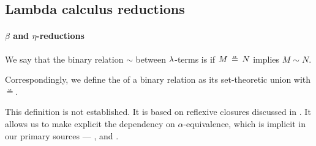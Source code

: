 \subsection{Lambda calculus reductions}\label{subsec:lambda_calculus_reductions}

\paragraph{\( \beta \) and \( \eta \)-reductions}

\begin{definition}\label{def:alpha_reflexive_closure}\mimprovised
  We say that the binary relation \( {\sim} \) between \( \mathrm{\lambda} \)-terms is  if \( M \aequiv N \) implies \( M \sim N \).

  Correspondingly, we define the  of a binary relation as its set-theoretic union with \( {\aequiv} \).
\end{definition}
\begin{comments}
  \item This definition is not established. It is based on reflexive closures discussed in . It allows us to make explicit the dependency on \( \alpha \)-equivalence, which is implicit in our primary sources --- \cite[ch. 3]{Barendregt1984}, \cite[1B2]{Hindley1997} and \cite[191]{Герасимов2011}.
\end{comments}

